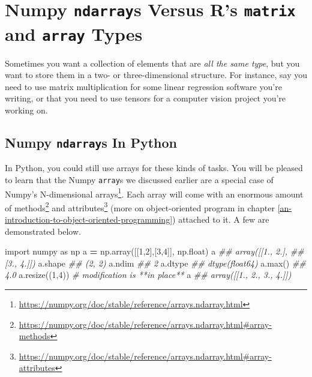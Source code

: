 \documentclass[
  12pt,
  krantz2]{krantz}
\makeatletter
\newenvironment{Shaded}{\begin{snugshade}}{\end{snugshade}}
\newcommand{\BuiltInTok}[1]{#1}
\newcommand{\CommentTok}[1]{\textcolor[rgb]{0.37,0.37,0.37}{\textit{#1}}}
\newcommand{\DecValTok}[1]{\textcolor[rgb]{0.06,0.06,0.06}{#1}}
\newcommand{\ImportTok}[1]{#1}
\newcommand{\NormalTok}[1]{#1}
\newcommand{\OperatorTok}[1]{\textcolor[rgb]{0.43,0.43,0.43}{\textbf{#1}}}
\renewcommand{\href}[2]{#2\footnote{\url{#1}}}
\newenvironment{kframe}{%
\medskip{}
\setlength{\fboxsep}{.8em}
 \def\at@end@of@kframe{}%
 \ifinner\ifhmode%
  \def\at@end@of@kframe{\end{minipage}}%
  \begin{minipage}{\columnwidth}%
 \fi\fi%
 \def\FrameCommand##1{\hskip\@totalleftmargin \hskip-\fboxsep
 \colorbox{shadecolor}{##1}\hskip-\fboxsep
     \hskip-\linewidth \hskip-\@totalleftmargin \hskip\columnwidth}%
 \MakeFramed {\advance\hsize-\width
   \@totalleftmargin\z@ \linewidth\hsize
   \@setminipage}}%
 {\par\unskip\endMakeFramed%
 \at@end@of@kframe}
\renewenvironment{Shaded}{\begin{kframe}}{\end{kframe}}
\makeatother
\begin{document}
\hypertarget{numpy-ndarrays-versus-rs-matrix-and-array-types}{%
\chapter{\texorpdfstring{Numpy \texttt{ndarray}s Versus R's \texttt{matrix} and \texttt{array} Types}{Numpy ndarrays Versus R's matrix and array Types}}\label{numpy-ndarrays-versus-rs-matrix-and-array-types}}

Sometimes you want a collection of elements that are \emph{all the same type}, but you want to store them in a two- or three-dimensional structure. For instance, say you need to use matrix multiplication for some linear regression software you're writing, or that you need to use tensors for a computer vision project you're working on.

\hypertarget{numpy-ndarrays-in-python}{%
\section{\texorpdfstring{Numpy \texttt{ndarray}s In Python}{Numpy ndarrays In Python}}\label{numpy-ndarrays-in-python}}

In Python, you could still use arrays for these kinds of tasks. You will be pleased to learn that the Numpy \texttt{array}s we discussed earlier are a special case of \href{https://numpy.org/doc/stable/reference/arrays.ndarray.html}{Numpy's N-dimensional arrays}. Each array will come with an enormous amount of \href{https://numpy.org/doc/stable/reference/arrays.ndarray.html\#array-methods}{methods} and \href{https://numpy.org/doc/stable/reference/arrays.ndarray.html\#array-attributes}{attributes} (more on object-oriented program in chapter \ref{an-introduction-to-object-oriented-programming}) attached to it. A few are demonstrated below.

\begin{Shaded}
\begin{Highlighting}[]
\ImportTok{import}\NormalTok{ numpy }\ImportTok{as}\NormalTok{ np}
\NormalTok{a }\OperatorTok{=}\NormalTok{ np.array([[}\DecValTok{1}\NormalTok{,}\DecValTok{2}\NormalTok{],[}\DecValTok{3}\NormalTok{,}\DecValTok{4}\NormalTok{]], np.}\BuiltInTok{float}\NormalTok{)}
\NormalTok{a}
\CommentTok{\#\# array([[1., 2.],}
\CommentTok{\#\#        [3., 4.]])}
\NormalTok{a.shape}
\CommentTok{\#\# (2, 2)}
\NormalTok{a.ndim}
\CommentTok{\#\# 2}
\NormalTok{a.dtype}
\CommentTok{\#\# dtype(\textquotesingle{}float64\textquotesingle{})}
\NormalTok{a.}\BuiltInTok{max}\NormalTok{()}
\CommentTok{\#\# 4.0}
\NormalTok{a.resize((}\DecValTok{1}\NormalTok{,}\DecValTok{4}\NormalTok{)) }\CommentTok{\# modification is **in place**}
\NormalTok{a}
\CommentTok{\#\# array([[1., 2., 3., 4.]])}
\end{Highlighting}
\end{Shaded}
\end{document}
